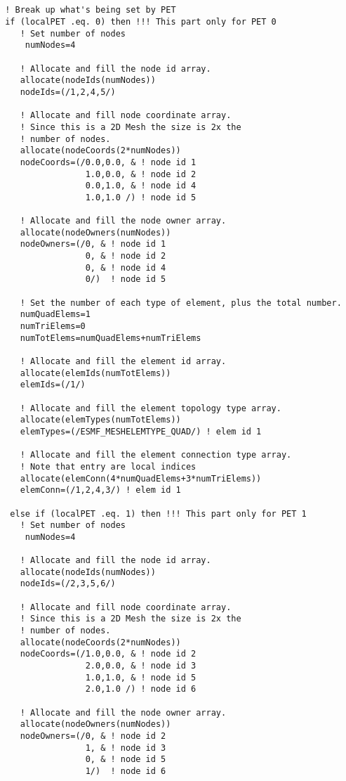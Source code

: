  \begin{verbatim}


 ! Break up what's being set by PET
 if (localPET .eq. 0) then !!! This part only for PET 0
    ! Set number of nodes
     numNodes=4

    ! Allocate and fill the node id array.
    allocate(nodeIds(numNodes))
    nodeIds=(/1,2,4,5/) 

    ! Allocate and fill node coordinate array.
    ! Since this is a 2D Mesh the size is 2x the
    ! number of nodes.
    allocate(nodeCoords(2*numNodes))
    nodeCoords=(/0.0,0.0, & ! node id 1
                 1.0,0.0, & ! node id 2
                 0.0,1.0, & ! node id 4
                 1.0,1.0 /) ! node id 5

    ! Allocate and fill the node owner array.
    allocate(nodeOwners(numNodes))
    nodeOwners=(/0, & ! node id 1
                 0, & ! node id 2
                 0, & ! node id 4
                 0/)  ! node id 5

    ! Set the number of each type of element, plus the total number.
    numQuadElems=1
    numTriElems=0
    numTotElems=numQuadElems+numTriElems

    ! Allocate and fill the element id array.
    allocate(elemIds(numTotElems))
    elemIds=(/1/) 

    ! Allocate and fill the element topology type array.
    allocate(elemTypes(numTotElems))
    elemTypes=(/ESMF_MESHELEMTYPE_QUAD/) ! elem id 1

    ! Allocate and fill the element connection type array.
    ! Note that entry are local indices
    allocate(elemConn(4*numQuadElems+3*numTriElems))
    elemConn=(/1,2,4,3/) ! elem id 1

  else if (localPET .eq. 1) then !!! This part only for PET 1
    ! Set number of nodes
     numNodes=4

    ! Allocate and fill the node id array.
    allocate(nodeIds(numNodes))
    nodeIds=(/2,3,5,6/) 

    ! Allocate and fill node coordinate array.
    ! Since this is a 2D Mesh the size is 2x the
    ! number of nodes.
    allocate(nodeCoords(2*numNodes))
    nodeCoords=(/1.0,0.0, & ! node id 2
                 2.0,0.0, & ! node id 3
                 1.0,1.0, & ! node id 5
                 2.0,1.0 /) ! node id 6

    ! Allocate and fill the node owner array.
    allocate(nodeOwners(numNodes))
    nodeOwners=(/0, & ! node id 2
                 1, & ! node id 3
                 0, & ! node id 5
                 1/)  ! node id 6


\end{verbatim}
